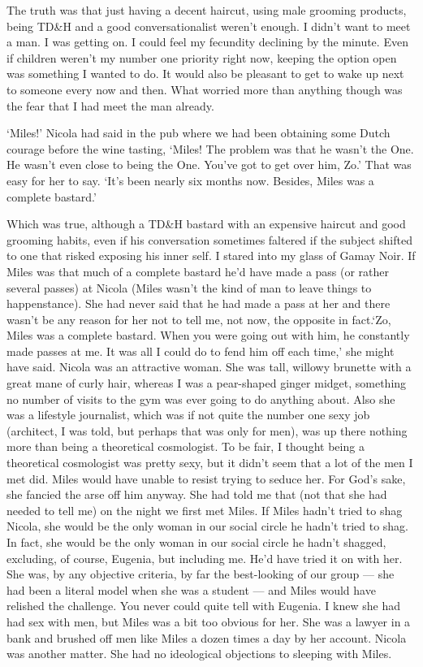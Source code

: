 The truth was that just having a decent haircut, using male
grooming products, being TD{\&}H and a good conversationalist
weren't enough. I didn't want to meet {\twelveit a\/} man. I was getting on. I could feel my fecundity declining by the minute. Even if children weren't my number one priority right now, keeping the option open was something I wanted to do. It would also be pleasant to get to wake up next to someone every now and then. What worried more than anything though was the fear that I had meet
{\twelveit the\/} man already.

`Miles!' Nicola had said in the pub where we had been obtaining some Dutch courage before the wine
tasting, `Miles! The problem was that he wasn't
{\twelveit the\/} One. He wasn't even close to being {\twelveit
the\/} One. You've got to get over him, Zo.' That was easy for her to say. `It's been nearly six months now. Besides, Miles was a complete bastard.'

Which was true, although a TD{\&}H bastard with an expensive haircut and good grooming habits, even if his conversation sometimes faltered if the subject shifted to one that risked exposing his inner self. I stared into my glass of Gamay Noir. If Miles was that much of a complete bastard he'd have made a pass (or rather several passes) at Nicola
(Miles wasn't the kind of man to leave things to happenstance). She
had never said that he had made a pass at her and there wasn't be any reason for her
not to tell me, not now, the opposite in fact.`Zo, Miles {\twelveit was\/} a
complete bastard. When you were going out with him, he constantly made passes at me. It was all I could do
to fend him off each time,' she might have said. Nicola {\twelveit was\/} an attractive woman. She was tall, willowy brunette with a great mane of curly hair, whereas I was a pear-shaped ginger midget, something no number of visits to the gym was ever going to do anything about. Also she was a lifestyle journalist, which was if not quite the number one sexy job (architect, I was told, but perhaps that was only for men), was up there nothing more than being a theoretical cosmologist. To be fair, I thought being a theoretical cosmologist was pretty sexy, but it didn't seem that a lot of the men I met did. Miles
would have unable to resist trying to seduce her. For God's sake,
she fancied the arse off him anyway. She had told me that (not
that she had needed to tell me) on the night we first met Miles. If
Miles hadn't tried to shag Nicola, she would be the only woman in our social
circle he hadn't tried to shag. In fact, she would be the only woman in our social circle he hadn't shagged, excluding, of course, Eugenia, but including me. He'd have tried it on with her. She was, by any objective criteria, by far the best-looking of our group --- she had been a literal model when she was a student --- and Miles would have relished the challenge. You never could quite tell with Eugenia. I knew she had had sex with men, but Miles was a bit too obvious for her. She was a lawyer in a bank and brushed off men like Miles a dozen times a day by her account. Nicola was another matter. She had no {\twelveit ideological\/} objections to sleeping with Miles.

